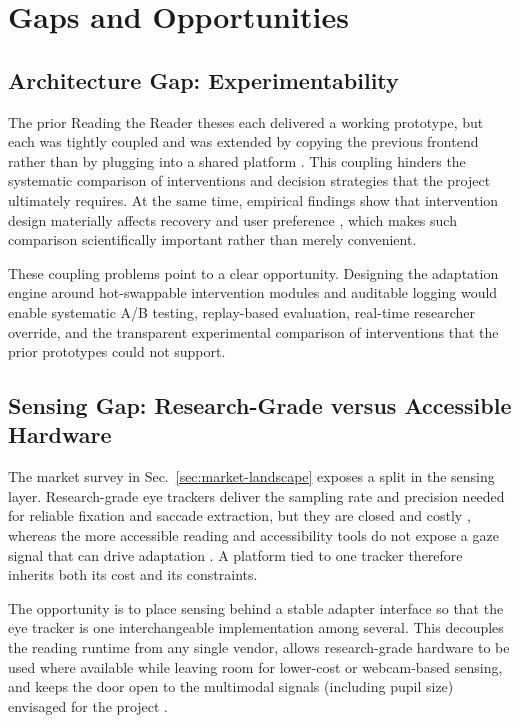 \section{Gaps and Opportunities}
\label{sec:gaps-opportunities}

\subsection{Architecture Gap: Experimentability}
\label{subsec:gap-experimentability}
The prior Reading the Reader theses each delivered a working prototype, but each was tightly coupled and was extended by copying the previous frontend rather than by plugging into a shared platform \cite{refsgaard2024rtr, pereira2024typography, palinec2024reactive}.
This coupling hinders the systematic comparison of interventions and decision strategies that the project ultimately requires.
At the same time, empirical findings show that intervention design materially affects recovery and user preference \cite{jensen2025context}, which makes such comparison scientifically important rather than merely convenient.

These coupling problems point to a clear opportunity.
Designing the adaptation engine around hot-swappable intervention modules and auditable logging would enable systematic A/B testing, replay-based evaluation, real-time researcher override, and the transparent experimental comparison of interventions that the prior prototypes could not support.

\subsection{Sensing Gap: Research-Grade versus Accessible Hardware}
\label{subsec:gap-sensing}
The market survey in Sec.~\ref{sec:market-landscape} exposes a split in the sensing layer.
Research-grade eye trackers deliver the sampling rate and precision needed for reliable fixation and saccade extraction, but they are closed and costly \cite{tobii2025fusion, srresearch2025eyelink, gazepoint2025gp3, pupillabs2025neon}, whereas the more accessible reading and accessibility tools do not expose a gaze signal that can drive adaptation \cite{orcam2025read3, microsoft2025immersive, amazon2025kindle}.
A platform tied to one tracker therefore inherits both its cost and its constraints.

The opportunity is to place sensing behind a stable adapter interface so that the eye tracker is one interchangeable implementation among several.
This decouples the reading runtime from any single vendor, allows research-grade hardware to be used where available while leaving room for lower-cost or webcam-based sensing, and keeps the door open to the multimodal signals (including pupil size) envisaged for the project \cite{dtucompute2025rtr}.

